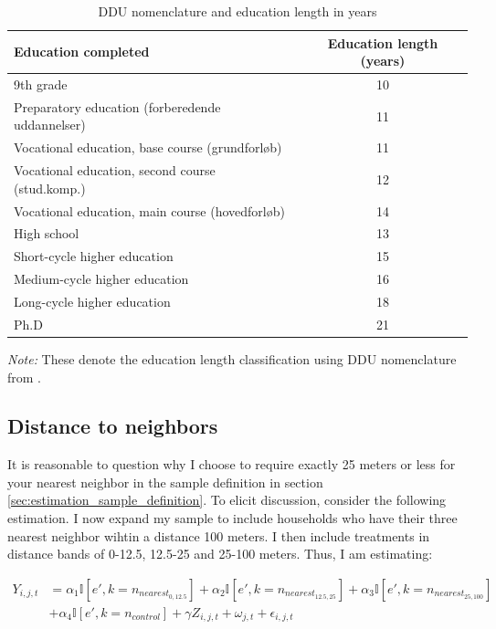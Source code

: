 \documentclass[../main.tex]{subfiles}
\begin{document}
\begin{table}[H]
    \caption{DDU nomenclature and education length in years}
    \label{tab:dst_disced15_educ_length_classification}
        \centering
\begin{threeparttable}
    \begin{tabular}{lc}
    \toprule
    Education completed & Education length (years) \\
    \midrule
         9th grade & 10 \\
         Preparatory education (forberedende uddannelser) & 11 \\
         Vocational education, base course (grundforløb) & 11 \\
         Vocational education, second course (stud.komp.)  & 12 \\
         Vocational education, main course (hovedforløb)  & 14 \\
         High school & 13 \\
         Short-cycle higher education & 15 \\
         Medium-cycle higher education & 16 \\
         Long-cycle higher education & 18 \\
         Ph.D & 21 \\
    \midrule
    \end{tabular}
    \label{tab:my_label}
\begin{tablenotes}[flushleft]
\item \scriptsize \textit{Note:} These denote the education length classification using DDU nomenclature from \textcite{dst_ddu_edu}.
\end{tablenotes}
\end{threeparttable}
\end{table}

\subsection{Distance to neighbors}
It is reasonable to question why I choose to require exactly 25 meters or less for your nearest neighbor in the sample definition in section \ref{sec:estimation_sample_definition}. To elicit discussion, consider the following estimation. I now expand my sample to include households who have their three nearest neighbor wihtin a distance 100 meters. I then include treatments in distance bands of 0-12.5, 12.5-25 and 25-100 meters. Thus, I am estimating:

\begin{equation}
\begin{split}
    Y_{i, j, t} &= \alpha_1 \mathbb{I}[e', k=n_{nearest_{0,12.5}}] + \alpha_2 \mathbb{I}[e', k=n_{nearest_{12.5,25}}] + \alpha_3 \mathbb{I}[e', k=n_{nearest_{25, 100}}] \\
    &+  \alpha_4 \mathbb{I}[e', k = n_{control}] + \gamma Z_{i, j, t} + \omega_{j, t} + \epsilon_{i, j, t}
\label{eq:main_eq_schelling_behavior_100m}
\end{split}
\end{equation}
\end{document}
